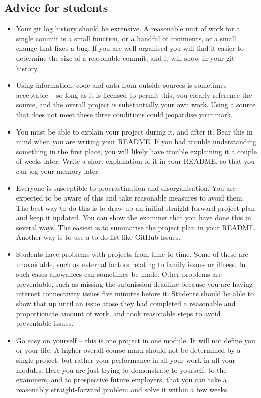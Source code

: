 \documentclass[12pt, a4paper]{article}
\begin{document}
\subsection*{Advice for students}
\begin{itemize}
    \item
    Your git log history should be extensive.
    A reasonable unit of work for a single commit is a small function, or a handful of comments, or a small change that fixes a bug.
    If you are well organised you will find it easier to determine the size of a reasonable commit, and it will show in your git history.
    \item
    Using information, code and data from outside sources is sometimes acceptable -- so long as it is licensed to permit this, you clearly reference the source, and the overall project is substantially your own work.
    Using a source that does not meet these three conditions could jeopardise your mark.
    \item
    You must be able to explain your project during it, and after it.
    Bear this in mind when you are writing your README.
    If you had trouble understanding something in the first place, you will likely have trouble explaining it a couple of weeks later.
    Write a short explanation of it in your README, so that you can jog your memory later.
    \item
    Everyone is susceptible to procrastination and disorganisation.
    You are expected to be aware of this and take reasonable measures to avoid them.
    The best way to do this is to draw up an initial straight-forward project plan and keep it updated.
    You can show the examiner that you have done this in several ways.
    The easiest is to summarise the project plan in your README.
    Another way is to use a to-do list like GitHub Issues.
    \item
    Students have problems with projects from time to time.
    Some of these are unavoidable, such as external factors relating to family issues or illness.
    In such cases allowances can sometimes be made.
    Other problems are preventable, such as missing the submission deadline because you are having internet connectivity issues five minutes before it.
    Students should be able to show that up until an issue arose they had completed a reasonable and proportionate amount of work, and took reasonable steps to avoid preventable issues.
    \item
    Go easy on yourself -- this is one project in one module.
    It will not define you or your life.
    A higher overall course mark should not be determined by a single project, but rather your performance in all your work in all your modules.
    Here you are just trying to demonstrate to yourself, to the examiners, and to prospective future employers, that you can take a reasonably straight-forward problem and solve it within a few weeks.
\end{itemize}




\end{document}

